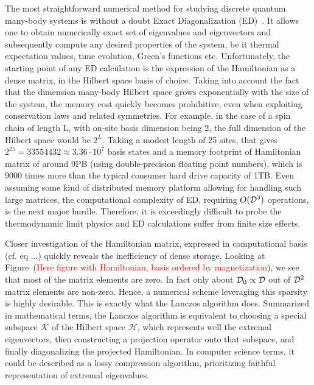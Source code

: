 The most straightforward numerical method for studying discrete quantum many-body systems is without a doubt
Exact Diagonalization (ED)~\autocite{Weisse2008}.
It allows one to obtain numerically exact set of eigenvalues and eigenvectors and subsequently compute any desired properties
of the system, be it thermal expectation values, time evolution, Green's functions etc. Unfortunately, the starting point of any
ED calculation is the expression of the Hamiltonian as a dense matrix, in the Hilbert space basis of choice. Taking into account
the fact that the dimension many-body Hilbert space grows exponentially with the size of the system, the memory cost quickly becomes
prohibitive, even when exploiting conservation laws and related symmetries. For example, in the case of a spin chain of length L, with 
on-site basis dimension being 2, the full dimension of the Hilbert space would be \(2^{L}\). Taking a modest length of 25 sites, that gives
\(2^{25} = 33554432\approx 3.36 \cdot 10^7\) basis states and a memory footprint of Hamiltonian matrix of around 9PB (using double-precision
floating point numbers), which is 9000 times more than the typical consumer hard drive capacity of 1TB. Even assuming some kind of distributed
memory platform allowing for handling such large matrices, the computational complexity of ED, requiring \(O(\mathcal{D}^3)\) operations,
is the next major hurdle. Therefore, it is exceedingly
difficult to probe the thermodynamic limit physics and ED calculations suffer from finite size effects.

Closer investigation of the Hamiltonian matrix, expressed in computational basis (cf. eq ...) quickly reveals the inefficiency of dense
storage. Looking at Figure~(\textcolor{red}{Here figure with Hamiltonian, basis ordered by magnetization}), we see that most of
the matrix elements are zero. In fact only about \(\mathcal{D}_0\propto \mathcal{D} \) out of \(\mathcal{D}^2\) matrix elements
are non-zero. Hence, a numerical scheme leveraging this sparsity is highly desirable. This is exactly what the Lanczos
algorithm does.
Summarized in mathematical terms, the Lanczos algorithm is equivalent to choosing a special subspace \(\mathcal{K}\) of the
Hilbert space \(\mathcal{H}\), which represents well the extremal eigenvectors, then constructing a projection operator
onto that subspace, and finally diagonalizing the projected Hamiltonian.  
In computer science terms, it could be described as a lossy compression algorithm, prioritizing faithful representation of extremal eigenvalues.

